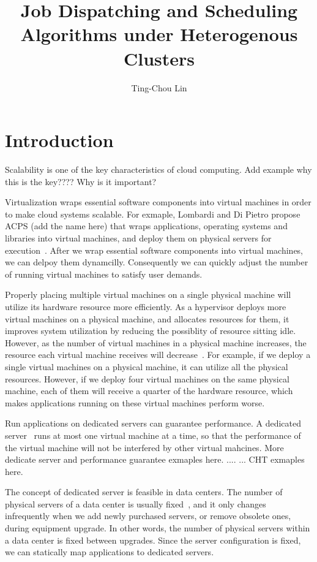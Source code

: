 \documentclass[11pt]{article}
\title{Job Dispatching and Scheduling Algorithms under Heterogenous
  Clusters}
\author{Ting-Chou Lin}
\date{}
\begin{document}
\maketitle

\section{Introduction}

Scalability is one of the key characteristics of cloud computing.
Add example why this is the key???? Why is it important?

Virtualization wraps essential software components into virtual
machines in order to make cloud systems scalable.  For exmaple,
Lombardi and Di Pietro propose ACPS (add the name here) that wraps
applications, operating systems and libraries into virtual machines,
and deploy them on physical servers for
execution~\cite{secure_virt_for_cloud, cloud_issue}.  After we wrap
essential software components into virtual machines, we can delpoy
them dynamcilly.  Consequently we can quickly adjust the number of
running virtual machines to satisfy user demands.

Properly placing multiple virtual machines on a single physical
machine will utilize its hardware resource more efficiently.  As a
hypervisor deploys more virtual machines on a physical machine, and
allocates resources for them, it improves system utilization by
reducing the possiblity of resource sitting idle.  However, as the
number of virtual machines in a physical machine increases, the
resource each virtual machine receives will
decrease~\cite{resource_overbooking}.  For example, if we deploy a
single virtual machines on a physical machine, it can utilize all the
physical resources.  However, if we deploy four virtual machines on
the same physical machine, each of them will receive a quarter of the
hardware resource, which makes applications running on these virtual
machines perform worse.

Run applications on dedicated servers can guarantee performance.  A
dedicated server~\cite{dedicated_hosting} runs at most one virtual
machine at a time, so that the performance of the virtual machine will
not be interfered by other virtual mahcines.  More dedicate server and
performance guarantee exmaples here. .... ... CHT exmaples here.

The concept of dedicated server is feasible in data centers.  The
number of physical servers of a data center is usually
fixed~\cite{maintenance_framework}, and it only changes infrequently
when we add newly purchased servers, or remove obsolete ones, during
equipment upgrade.  In other words, the number of physical servers
within a data center is fixed between upgrades.  Since the server
configuration is fixed, we can statically map applications to
dedicated servers.
\end{document}

